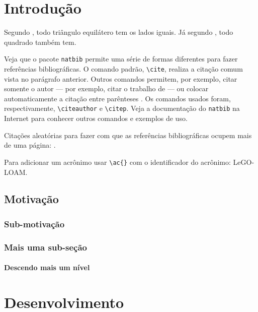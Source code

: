 \documentclass[phd,oneside]{ppgccufmg}  %
\begin{document}
\chapter{Introdução}

Segundo \cite{horn86robot}, todo triângulo equilátero tem os lados iguais. Já
segundo \cite{shashua97photometric}, todo quadrado também tem.

Veja que o pacote \verb|natbib| permite uma série de formas diferentes para
fazer referências bibliográficas. O comando padrão, \verb|\cite|, realiza a
citação comum vista no parágrafo anterior. Outros comandos permitem, por
exemplo, citar somente o autor --- por exemplo, citar o trabalho de
\citeauthor{samaras99coupled} --- ou colocar automaticamente a citação entre
parênteses \citep{hougen93estimation, sato99illumination2, sato99illumination1,
sato01stability}. Os comandos usados foram, respectivamente, \verb|\citeauthor|
e \verb|\citep|. Veja a documentação do \verb|natbib| na Internet para conhecer
outros comandos e exemplos de uso.

Citações aleatórias para fazer com que as referências bibliográficas ocupem
mais de uma página: \cite{bichsel92simple, dror01statistics, guisser92new}.

Para adicionar um acrônimo usar \verb|\ac{}| com o identificador do acrônimo: \ac{LeGO-LOAM}.

\section{Motivação}

\dummytxtb\dummytxta

\subsection{Sub-motivação}


\dummytxtc\dummytxtb

\subsection{Mais uma sub-seção}

\dummytxta\dummytxtc

\subsubsection{Descendo mais um nível}

\dummytxtb\dummytxta


\chapter{Desenvolvimento}
\end{document}
